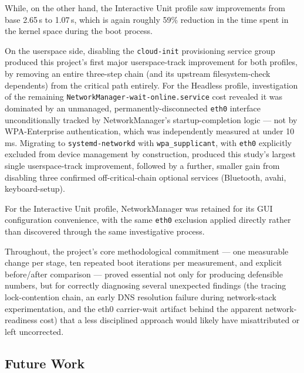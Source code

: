 \documentclass[11pt,a4paper]{article}
\begin{document}
While, on the other hand, the Interactive Unit profile saw improvements from base 2.65\,s to 1.07\,s, which is again roughly 59\% reduction in the time spent in the kernel space during the boot process. 

On the userspace side, disabling the \texttt{cloud-init} provisioning service group produced this project's first major userspace-track improvement for both profiles, by removing an entire three-step chain (and its upstream filesystem-check dependents) from the critical path entirely. For the Headless profile, investigation of the remaining \texttt{NetworkManager-wait-online.service} cost revealed it was dominated by an unmanaged, permanently-disconnected \texttt{eth0} interface unconditionally tracked by NetworkManager's startup-completion logic — not by WPA-Enterprise authentication, which was independently measured at under 10\,ms. Migrating to \texttt{systemd-networkd} with \texttt{wpa\_supplicant}, with \texttt{eth0} explicitly excluded from device management by construction, produced this study's largest single userspace-track improvement, followed by a further, smaller gain from disabling three confirmed off-critical-chain optional services (Bluetooth, avahi, keyboard-setup). 

For the Interactive Unit profile, NetworkManager was retained for its GUI configuration convenience, with the same \texttt{eth0} exclusion applied directly rather than discovered through the same investigative process. 


Throughout, the project's core methodological commitment — one measurable change per stage, ten repeated boot iterations per measurement, and explicit before/after comparison — proved essential not only for producing defensible numbers, but for correctly diagnosing several unexpected findings (the tracing lock-contention chain, an early DNS resolution failure during network-stack experimentation, and the eth0 carrier-wait artifact behind the apparent network-readiness cost) that a less disciplined approach would likely have misattributed or left uncorrected.

\subsection{Future Work}
\end{document}
